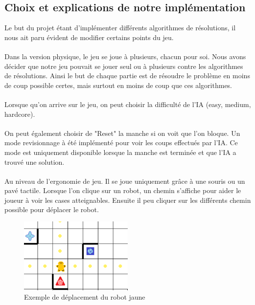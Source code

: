 \documentclass{article}
\begin{document}
\subsection{Choix et explications de notre implémentation}
Le but du projet étant d'implémenter différents algorithmes de résolutions, il nous ait paru évident de modifier certains points du jeu.\\\\Dans la version physique, le jeu se joue à plusieurs, chacun pour soi. Nous avons décider que notre jeu pouvait se jouer seul ou à plusieurs contre les algorithmes de résolutions. Ainsi le but de chaque partie est de résoudre le problème en moins de coup possible certes, mais surtout en moins de coup que ces algorithmes.\\\\Lorsque qu'on arrive sur le jeu, on peut choisir la difficulté de l'IA (easy, medium, hardcore).\\\\On peut également choisir de "Reset" la manche si on voit que l'on bloque. Un mode revisionnage à été implémenté pour voir les coups effectués par l'IA. Ce mode est uniquement disponible lorsque la manche est terminée et que l'IA a trouvé une solution.\\\\
Au niveau de l'ergonomie de jeu. Il se joue uniquement grâce à une souris ou un pavé tactile. Lorsque l'on clique sur un robot, un chemin s'affiche pour aider le joueur à voir les cases atteignables. Ensuite il peu cliquer sur les différents chemin possible pour déplacer le robot. 
\begin{figure}[h]
  \centering  
  \includegraphics[width=0.5\textwidth]{deplacement.png}  
  \caption{Exemple de déplacement du robot jaune} 
  \label{fig:Plateau}  
\end{figure}
\end{document}
